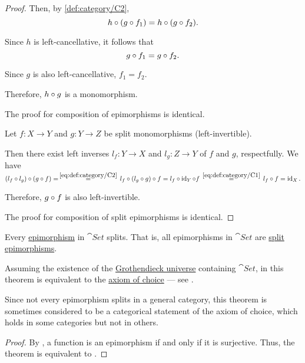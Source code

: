 \begin{proof}
  Then, by \ref{def:category/C2},
  \begin{equation*}
    h \bincirc (g \bincirc f_1) = h \bincirc (g \bincirc f_2).
  \end{equation*}

  Since \( h \) is left-cancellative, it follows that
  \begin{equation*}
    g \bincirc f_1 = g \bincirc f_2.
  \end{equation*}

  Since \( g \) is also left-cancellative, \( f_1 = f_2 \).

  Therefore, \( h \bincirc g \) is a monomorphism.

  The proof for composition of epimorphisms is identical.

   Let \( f: X \to Y \) and \( g: Y \to Z \) be split monomorphisms (left-invertible).

  Then there exist left inverses \( l_f: Y \to X \) and \( l_g: Z \to Y \) of \( f \) and \( g \), respectfully. We have
  \begin{equation*}
    (l_f \bincirc l_g) \bincirc (g \bincirc f)
    =
    \reloset {\eqref{eq:def:category/C2}} =
    l_f \bincirc (l_g \bincirc g) \bincirc f
    =
    l_f \bincirc \id_Y \bincirc f
    \reloset {\eqref{eq:def:category/C1}} =
    l_f \bincirc f
    =
    \id_X.
  \end{equation*}

  Therefore, \( g \bincirc f \) is also left-invertible.

  The proof for composition of split epimorphisms is identical.
\end{proof}

\begin{theorem}\label{thm:epimorphisms_split_in_set}
  Every \hyperref[def:morphism_invertibility/right_cancellative]{epimorphism} in \hyperref[def:category_of_small_sets]{\( \cat{Set} \)} splits. That is, all epimorphisms in \( \cat{Set} \) are \hyperref[def:morphism_invertibility/right_invertible]{split epimorphisms}.

  Assuming the existence of the \hyperref[def:grothendieck_universe]{Grothendieck universe} containing \( \cat{Set} \), in \hyperref[def:zfc]{} this theorem is equivalent to the \hyperref[def:zfc/choice]{axiom of choice} --- see .

  Since not every epimorphism splits in a general category, this theorem is sometimes considered to be a categorical statement of the axiom of choice, which holds in some categories but not in others.
\end{theorem}
\begin{proof}
  By , a function is an epimorphism if and only if it is surjective. Thus, the theorem is equivalent to .
\end{proof}

